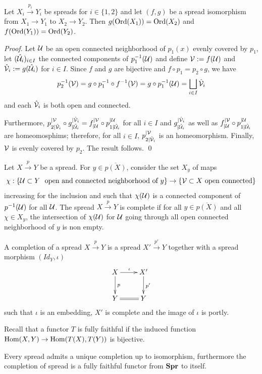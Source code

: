\begin{lem}\label{lem:ord_iso} Let $X_i\xrightarrow{p_i} Y_i$ be spreads for $i\in \{1,2\}$ and let $(f,g)$ be a spread isomorphism from $X_1\rightarrow Y_1$ to $X_2\rightarrow Y_2$. Then $g(\mathrm{Ord}(X_1)) = \mathrm{Ord}(X_2)$ and $f(\mathrm{Ord}(Y_1)) = \mathrm{Ord}(Y_2)$.
 
\end{lem}
\begin{proof}
 Let $\mathcal{U}$ be an open connected neighborhood of $p_1(x)$ evenly covered by $p_1$, let $(\hat{\mathcal{U}}_i)_{i\in I}$ the connected components of $p_1^{-1}(\mathcal{U})$ and define $\mathcal V:=f(\mathcal{U})$ and $\hat {\mathcal V}_i:= g(\hat {\mathcal{U}}_i)$ for $i\in I$. 
 Since $f$ and $g$ are bijective and $f\circ p_1=p_2\circ g$, we have $$p_2^{-1}(\mathcal V)=g\circ p_1^{-1}\circ f^{-1}(\mathcal V) = g\circ p_1^{-1}(\mathcal{U}) = \bigsqcup_{i\in I} \hat {\mathcal V}_i$$   
 and each $\hat {\mathcal V}_i$ is both open and connected.
 
 Furthermore, $p_{2|\hat{\mathcal V}_i}^{|\mathcal V}\circ g^{|\hat{\mathcal V}_i}_{|\hat{\mathcal{U}}_i} = f_{|\mathcal{U}}^{|\mathcal V}\circ p_{1|
 \hat{\mathcal{U}}_i}^{|\mathcal{U}}$ for all $i\in I$ and $g^{|\hat{\mathcal V}_i}_{|\hat{\mathcal{U}}_i}$ as well as $f_{|\mathcal{U}}^{|\mathcal V}\circ p_{1|
 \hat{\mathcal{U}}_i}^{|\mathcal{U}}$ are homeomosphims; therefore, for all $i\in I$, $p_{2|\hat{\mathcal V}_i}^{|\mathcal V}$ is an homeomorphism.
 Finally, $\mathcal V$ is evenly covered by $p_2$. The result follows.
 \qed\end{proof}

\begin{defi}\label{def:complete_spread_spread_completion} Let  $X\xrightarrow{p} Y$ be a spread. For $y\in \overline{p(X)}$, consider the set $X_y$ of maps $$\chi : \{\mathcal{U}\subset Y ~ \text{ open and connected neighborhood of }y\} \rightarrow \{\mathcal V\subset X ~ \text{open connected}\}$$ increasing for the inclusion and such that  $\chi(\mathcal{U})$ is a connected component of $p^{-1}(\mathcal{U})$ for all $\mathcal{U}$.
The spread $X\xrightarrow{p} Y$ is complete if for all $y\in \overline{p(X)}$ and all $\chi \in X_y$, the intersection of $\chi(\mathcal{U})$ for $\mathcal{U}$ going through all open connected neighborhood of $y$ is non empty.


A completion of a spread $X\xrightarrow{p} Y$ is a spread $X'\xrightarrow{p'} Y$ together with a spread morphism $(Id_Y,\iota)$
$$\xymatrix{
X\ar[d]^p \ar[r]^\iota & X' \ar[d]^{p'} \\ Y \ar@{=}[r] & Y
} $$
such that $\iota$ is an embedding, $X'$ is complete and the image of $\iota$ is portly.
\end{defi}
Recall that a functor $T$ is fully faithful if the induced function $\mathrm{Hom}(X,Y) \rightarrow \mathrm{Hom}(T(X),T(Y))$ is bijective.
\begin{thm}[\cite{MR0123298,MR2198590}] \label{theo:Fox_completion_functor}
 Every spread admits a unique completion up to isomorphism, furthermore the completion of spread is a fully faithful functor  from $\mathbf{Spr}$ to itself.
\end{thm}



